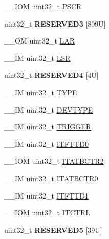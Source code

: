 \begin{DoxyCompactItemize}
\+\_\+\+\_\+\+I\+OM uint32\+\_\+t \mbox{\hyperlink{struct_t_p_i___type_ad092e61fccb6752d3f4adbbd4a7e1567}{P\+S\+CR}}
\item 
\mbox{\label{struct_t_p_i___type_a66322e42ec57eff3e05991b7701f29e1}} 
uint32\+\_\+t {\bfseries R\+E\+S\+E\+R\+V\+E\+D3} \mbox{[}809\+U\mbox{]}
\item 
\+\_\+\+\_\+\+OM uint32\+\_\+t \mbox{\hyperlink{struct_t_p_i___type_ae3a3197c7be6ce07b50fd87cbb02f319}{L\+AR}}
\item 
\+\_\+\+\_\+\+IM uint32\+\_\+t \mbox{\hyperlink{struct_t_p_i___type_af5373794b1c024b28a2a59a9eab6498e}{L\+SR}}
\item 
\mbox{\label{struct_t_p_i___type_acf52c485ef7661b09ce63a4f3dc0b879}} 
uint32\+\_\+t {\bfseries R\+E\+S\+E\+R\+V\+E\+D4} \mbox{[}4\+U\mbox{]}
\item 
\+\_\+\+\_\+\+IM uint32\+\_\+t \mbox{\hyperlink{struct_t_p_i___type_a01972f64f408cec28320780ca067b142}{T\+Y\+PE}}
\item 
\+\_\+\+\_\+\+IM uint32\+\_\+t \mbox{\hyperlink{struct_t_p_i___type_ad98855854a719bbea33061e71529a472}{D\+E\+V\+T\+Y\+PE}}
\item 
\+\_\+\+\_\+\+IM uint32\+\_\+t \mbox{\hyperlink{struct_t_p_i___type_a4d4cd2357f72333a82a1313228287bbd}{T\+R\+I\+G\+G\+ER}}
\item 
\+\_\+\+\_\+\+IM uint32\+\_\+t \mbox{\hyperlink{struct_t_p_i___type_a4c53b48c6bb49037c97742136d14b4f7}{I\+T\+F\+T\+T\+D0}}
\item 
\+\_\+\+\_\+\+I\+OM uint32\+\_\+t \mbox{\hyperlink{struct_t_p_i___type_ab358319b969d3fed0f89bbe33e9f1652}{I\+T\+A\+T\+B\+C\+T\+R2}}
\item 
\+\_\+\+\_\+\+IM uint32\+\_\+t \mbox{\hyperlink{struct_t_p_i___type_aaa573b2e073e76e93c51ecec79c616d0}{I\+T\+A\+T\+B\+C\+T\+R0}}
\item 
\+\_\+\+\_\+\+IM uint32\+\_\+t \mbox{\hyperlink{struct_t_p_i___type_aaf0447dd4b2c16dc1db1e2172c9dac8f}{I\+T\+F\+T\+T\+D1}}
\item 
\+\_\+\+\_\+\+I\+OM uint32\+\_\+t \mbox{\hyperlink{struct_t_p_i___type_aaa4c823c10f115f7517c82ef86a5a68d}{I\+T\+C\+T\+RL}}
\item 
\mbox{\label{struct_t_p_i___type_a9c1ac143e09b64b1f6eb92ecd65d60d0}} 
uint32\+\_\+t {\bfseries R\+E\+S\+E\+R\+V\+E\+D5} \mbox{[}39\+U\mbox{]}
\item 

\end{DoxyCompactItemize}
